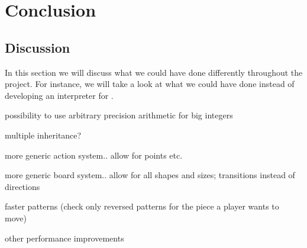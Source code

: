 \chapter{Conclusion}
\label{chap:conclusion}
 

\section{Discussion}
\label{sec:discussion}

In this section we will discuss what we could have done differently throughout
the project. For instance, we will take a look at what we could have done
instead of developing an interpreter for \productname{}.





possibility to use arbitrary precision arithmetic for big integers

multiple inheritance?

more generic action system.. allow for points etc.

more generic board system.. allow for all shapes and sizes; transitions instead
of directions

faster patterns (check only reversed patterns for the piece a player wants to move)

other performance improvements
